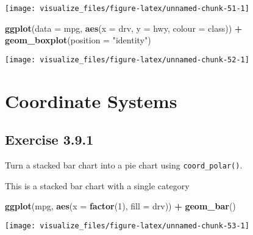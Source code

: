 \documentclass[]{book}
\newenvironment{Shaded}{\begin{snugshade}}{\end{snugshade}}
\newcommand{\DataTypeTok}[1]{\textcolor[rgb]{0.13,0.29,0.53}{#1}}
\newcommand{\DecValTok}[1]{\textcolor[rgb]{0.00,0.00,0.81}{#1}}
\newcommand{\KeywordTok}[1]{\textcolor[rgb]{0.13,0.29,0.53}{\textbf{#1}}}
\newcommand{\NormalTok}[1]{#1}
\newcommand{\OperatorTok}[1]{\textcolor[rgb]{0.81,0.36,0.00}{\textbf{#1}}}
\newcommand{\StringTok}[1]{\textcolor[rgb]{0.31,0.60,0.02}{#1}}
\theoremstyle{plain}
\theoremstyle{remark}
\begin{document}
\begin{center}\texttt{[image: visualize\_files/figure-latex/unnamed-chunk-51-1]} \end{center}

\begin{Shaded}
\begin{Highlighting}[]
\KeywordTok{ggplot}\NormalTok{(}\DataTypeTok{data =}\NormalTok{ mpg, }\KeywordTok{aes}\NormalTok{(}\DataTypeTok{x =}\NormalTok{ drv, }\DataTypeTok{y =}\NormalTok{ hwy, }\DataTypeTok{colour =}\NormalTok{ class)) }\OperatorTok{+}
\StringTok{  }\KeywordTok{geom_boxplot}\NormalTok{(}\DataTypeTok{position =} \StringTok{"identity"}\NormalTok{)}
\end{Highlighting}
\end{Shaded}

\begin{center}\texttt{[image: visualize\_files/figure-latex/unnamed-chunk-52-1]} \end{center}

\hypertarget{coordinate-systems}{%
\section{Coordinate Systems}\label{coordinate-systems}}

\hypertarget{exercise-3.9.1}{%
\subsection*{\texorpdfstring{Exercise
{3.9.1}}{Exercise 3.9.1}}\label{exercise-3.9.1}}

Turn a stacked bar chart into a pie chart using \texttt{coord\_polar()}.

This is a stacked bar chart with a single category

\begin{Shaded}
\begin{Highlighting}[]
\KeywordTok{ggplot}\NormalTok{(mpg, }\KeywordTok{aes}\NormalTok{(}\DataTypeTok{x =} \KeywordTok{factor}\NormalTok{(}\DecValTok{1}\NormalTok{), }\DataTypeTok{fill =}\NormalTok{ drv)) }\OperatorTok{+}
\StringTok{  }\KeywordTok{geom_bar}\NormalTok{()}
\end{Highlighting}
\end{Shaded}

\begin{center}\texttt{[image: visualize\_files/figure-latex/unnamed-chunk-53-1]} \end{center}
\end{document}
